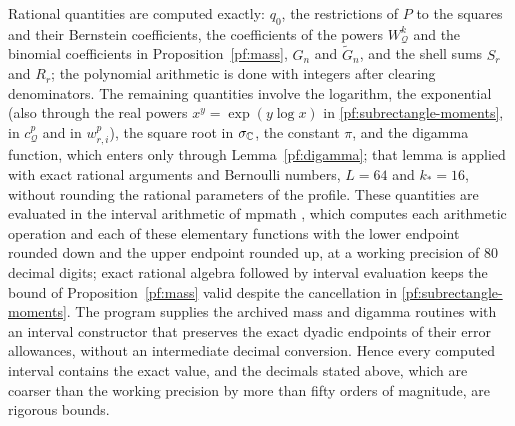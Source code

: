 Rational quantities are computed exactly: $q_0$, the restrictions of
$P$ to the squares and their Bernstein coefficients, the coefficients
of the powers $W_{\mathcal Q}^k$ and the binomial coefficients in
Proposition~\ref{pf:mass}, $G_n$ and $\widetilde G_n$, and the shell
sums $S_r$ and $R_r$; the polynomial arithmetic is done with integers
after clearing denominators. The remaining quantities involve the
logarithm, the exponential (also through the real powers
$x^y=\exp(y\log x)$ in \eqref{pf:subrectangle-moments}, in
$c_{\mathcal Q}^p$ and in $w_{r,i}^p$), the square root in $\sigma_\mathbb C$,
the constant $\pi$, and the digamma function, which enters only through
Lemma~\ref{pf:digamma}; that lemma is applied with exact rational
arguments and Bernoulli numbers, $L=64$ and $k_*=16$, without rounding
the rational parameters of the profile. These quantities are evaluated
in the interval arithmetic of mpmath \cite{Mpmath}, which computes each
arithmetic operation and each of these elementary functions with the
lower endpoint rounded down and the upper endpoint rounded up, at a
working precision of $80$ decimal digits; exact rational algebra
followed by interval evaluation keeps the bound of
Proposition~\ref{pf:mass} valid despite the cancellation in
\eqref{pf:subrectangle-moments}. The program supplies the archived mass
and digamma routines with an interval constructor that preserves the exact
dyadic endpoints of their error allowances, without an intermediate
decimal conversion. Hence every computed interval contains
the exact value, and the decimals stated above, which are coarser than
the working precision by more than fifty orders of magnitude, are
rigorous bounds.
